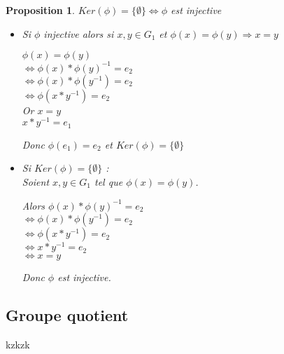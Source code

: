 \documentclass[12pt]{report}
\theoremstyle{break}%
\newtheorem{maprop}{Proposition}[chapter]
\begin{document}
\begin{maprop}
	$Ker(\phi)=\{\emptyset\} \Leftrightarrow \phi $ est injective 
	\newline
	 
	\begin{itemize}\renewcommand{\labelitemi}{$\bullet$}
		\item Si $\phi$ injective alors si $ x, y \in G_1$ et $\phi(x) = \phi(y) \Rightarrow x=y $
		\begin{tabbing}
	 	\hspace{0.5cm}$\phi(x) = \phi(y)$ \\ 
	 	$ \Leftrightarrow \phi(x) * \phi(y)^{-1} = e_2 $ \\
		$\Leftrightarrow \phi(x) * \phi(y^{-1}) = e_2 $ \\
	 	$\Leftrightarrow \phi(x*y^{-1})=e_2  $ \\ 
		Or $x=y $\\
		\hspace{0.4cm} $x*y^{-1}=e_1$\\
		\end{tabbing}
		Donc $\phi(e_1) = e_2 $ et $Ker(\phi) = \{\emptyset\}$ \\
	
		\item Si $Ker(\phi)=\{\emptyset\}$ :\\
		 Soient $x, y \in G_1 $ tel que $\phi(x)=\phi(y)$.
		 \begin{tabbing}
	 	Alors
	 	$\phi(x) * \phi(y)^{-1} = e_2 $ \\ 
	 	\hspace{0.4cm} $ \Leftrightarrow \phi(x) * \phi(y^{-1}) = e_2 $ \\
		\hspace{0.4cm} $\Leftrightarrow \phi(x*y^{-1}) = e_2 $ \\
	 	\hspace{0.4cm} $\Leftrightarrow x*y^{-1}=e_2  $ \\ 
	 	\hspace{0.4cm} $\Leftrightarrow x = y  $
		\end{tabbing}
		Donc $\phi$ est injective.
	\end{itemize}
\end{maprop}

\subsection{Groupe quotient}

\newpage
kzkzk
\end{document}
